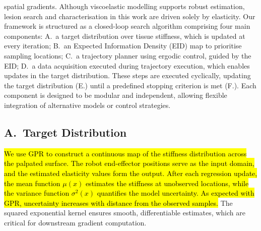 \documentclass[11pt]{article}
\begin{document}
spatial gradients. Although viscoelastic modelling supports robust
estimation, lesion search and characterisation in this work are
driven solely by elasticity. Our framework is structured as a
closed-loop search algorithm comprising four main components:
A.~a target distribution over tissue stiffness, which is updated at
every iteration; B.~an Expected Information Density (EID) map to
prioritise sampling locations; C.~a trajectory planner using ergodic
control, guided by the EID; D.~a data acquisition executed during
trajectory execution, which enables updates in the target
distribution. These steps are executed cyclically, updating the
target distribution (E.) until a predefined stopping criterion is
met (F.). Each component is designed to be modular and independent,
allowing flexible integration of alternative models or control
strategies.

\subsection*{A.\ Target Distribution}

\hl{We use GPR to construct a continuous map of the stiffness
distribution across the palpated surface. The robot end-effector
positions serve as the input domain, and the estimated elasticity
values form the output. After each regression update, the mean
function $\mu(x)$ estimates the stiffness at unobserved locations,
while the variance function $\sigma^{2}(x)$ quantifies the model
uncertainty. As expected with GPR, uncertainty increases with
distance from the observed samples.} The squared exponential kernel
ensures smooth, differentiable estimates, which are critical for
downstream gradient computation.
\end{document}
